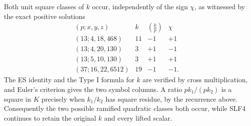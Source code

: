 \documentclass[11pt]{article}
\begin{document}
Both unit square classes of $k$ occur, independently of the sign
$\chi$, as witnessed by the exact positive solutions
\[
\begin{array}{c|c|c|c}
 (p;x,y,z)&k&\left(\frac{k}{p}\right)&\chi\\\hline
 (13;4,18,468)&11&-1&+1\\
 (13;4,20,130)&3&+1&-1\\
 (13;5,10,130)&3&+1&+1\\
 (37;16,22,6512)&19&-1&-1.
\end{array}                                                    \tag{SLF18}
\]
The ES identity and the Type I formula for $k$ are verified by
cross multiplication, and Euler's criterion gives the two symbol
columns. A ratio $pk_1/(pk_2)$ is a square in $K$ precisely when
$k_1/k_2$ has square residue, by the recurrence above. Consequently
the two possible ramified quadratic classes both occur, while
SLF4 continues to retain the original $k$ and every lifted scalar.
\end{document}
